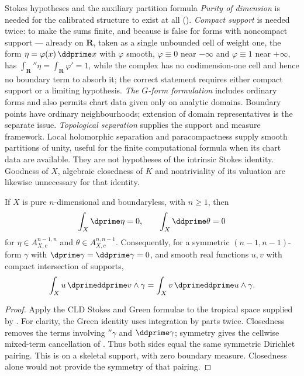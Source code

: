 \begin{warning}{Stokes hypotheses and the auxiliary partition formula}
\emph{Purity of dimension} is needed for the calibrated structure to exist at
all ().  \emph{Compact support} is
needed twice: to make the sums finite, and because
 is false for forms with noncompact support ---
already on $\mathbf R$, taken as a single unbounded cell of weight one, the
form $\eta=\varphi(x)\,\ddprime x$ with $\varphi$ smooth, $\varphi\equiv0$
near $-\infty$ and $\varphi\equiv1$ near $+\infty$, has
$\int_{\mathbf R}\dprime\eta=\int_{\mathbf R}\varphi'=1$, while the complex
has no codimension-one cell and hence no boundary term to absorb it; the
correct statement requires either compact support or a limiting
hypothesis.
\emph{The $G$-form formulation} includes ordinary forms and also permits
chart data given only on analytic domains.  Boundary points have ordinary
neighbourhoods; extension of domain representatives is the separate issue.
\emph{Topological separation} supplies the support and measure framework.
Local holomorphic separation and paracompactness supply smooth partitions
of unity, useful for the finite computational formula when its chart data
are available.  They are not hypotheses of the intrinsic Stokes identity.
Goodness of $X$, algebraic closedness of $K$ and nontriviality of its
valuation are likewise unnecessary for that identity.
\end{warning}

\begin{corollary}\label{cor:analytic-stokes-green}
If $X$ is pure $n$-dimensional and boundaryless, with $n\ge1$, then
\[
 \int_X\dprime\eta=0,
 \qquad \int_X\ddprime\theta=0
\]
for $\eta\in A_{X,c}^{n-1,n}$ and
$\theta\in A_{X,c}^{n,n-1}$.  Consequently, for a symmetric
$(n-1,n-1)$-form $\gamma$ with $\dprime\gamma=\ddprime\gamma=0$,
and smooth real functions $u,v$ with compact intersection of supports,
\[
 \int_Xu\,\dprimeddprime v\wedge\gamma
 =\int_Xv\,\dprimeddprime u\wedge\gamma.
\]
\end{corollary}
\begin{proof}
Apply the CLD Stokes and Green formulae
\cite[Proposition~5.11.1]{CLD25} to the tropical space supplied by
.  For clarity, the Green
identity uses integration by parts twice.  Closedness removes the terms
involving $\dprime\gamma$ and $\ddprime\gamma$; symmetry gives the
cellwise mixed-term cancellation of .
Thus both sides equal the same symmetric Dirichlet pairing.  This is
 on a skeletal support, with zero boundary
measure.  Closedness alone would not provide the symmetry of that pairing.
\end{proof}

